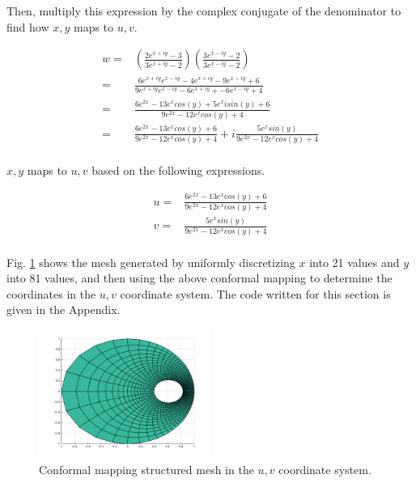 \documentclass[10pt]{article}
\begin{document}
Then, multiply this expression by the complex conjugate of the denominator to find how \(x,y\) maps to \(u,v\). 

\begin{equation}
\begin{aligned}
w=& \left(\frac{2e^{x+iy}-3}{3e^{x+iy}-2}\right)\left(\frac{3e^{x-iy}-2}{3e^{x-iy}-2}\right)\\
=& \frac{6e^{x+iy}e^{x-iy}-4e^{x+iy}-9e^{x-iy}+6}{9e^{x+iy}e^{x-iy}-6e^{x+iy}+-6e^{x-iy}+4}\\
=& \frac{6e^{2x}-13e^xcos(y)+5e^xisin(y)+6}{9e^{2x}-12e^xcos(y)+4}\\
=& \frac{6e^{2x}-13e^xcos(y)+6}{9e^{2x}-12e^xcos(y)+4}+i\frac{5e^xsin(y)}{9e^{2x}-12e^xcos(y)+4}\\
\end{aligned}
\end{equation}

\(x,y\) maps to \(u,v\) based on the following expressions.

\begin{equation}
\label{eq:Trans}
\begin{aligned}
u =& \frac{6e^{2x}-13e^xcos(y)+6}{9e^{2x}-12e^xcos(y)+4}\\
v =& \frac{5e^xsin(y)}{9e^{2x}-12e^xcos(y)+4}\\
\end{aligned}
\end{equation}

Fig. \ref{fig:q3} shows the mesh generated by uniformly discretizing \(x\) into 21 values and \(y\) into 81 values, and then using the above conformal mapping to determine the coordinates in the \(u, v\) coordinate system. The code written for this section is given in the Appendix.

\begin{figure}[H]
\centering
\includegraphics[width=0.5\textwidth]{Question3.png}
\caption{Conformal mapping structured mesh in the \(u, v\) coordinate system.}
\label{fig:q3}
\end{figure}
\end{document}
